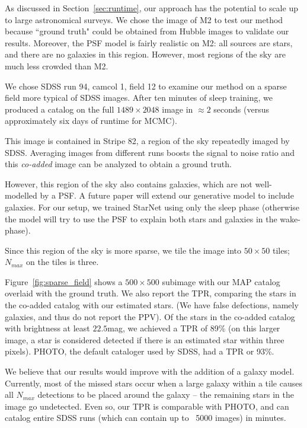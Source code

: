 As discussed in Section~\ref{sec:runtime}, our approach has the potential 
to scale up to large astronomical surveys. We chose the image of M2 to test our method because ``ground truth" could be obtained from Hubble images to validate our results. Moreover, 
the PSF model is fairly realistic on M2: all sources are 
stars, and there are no galaxies in this region. 
However, most regions of the sky are much less 
crowded than M2.


We chose SDSS run 94, camcol 1, field  12 to examine our method on a sparse field more typical of SDSS 
images. After ten minutes of sleep training, we produced a catalog on the full $1489\times 2048$ image in $\approx2$ seconds (versus approximately six days of runtime for MCMC). 

This image is contained in Stripe 82, a region of the sky repeatedly imaged by SDSS. Averaging images from different runs boosts the signal to noise ratio and this {\itshape co-added} image can be analyzed to obtain a ground truth. 

However, this region of the sky also contains galaxies, which are 
not well-modelled by a PSF. A future paper will extend our generative model to include galaxies. For our setup, we trained StarNet using only the sleep phase (otherwise the model will try to use the PSF to explain both stars and galaxies in the wake-phase). 

Since this region of the sky is more sparse, we tile the image into $50\times 50$ tiles; $N_{max}$ on the tiles is three. 

Figure~\ref{fig:sparse_field} shows a $500\times 500$ subimage with 
our MAP catalog overlaid with the ground truth. We also report the 
TPR, comparing the stars in the co-added catalog with our estimated stars. (We have false defections, namely galaxies, and thus 
do not report the PPV). Of the stars in the co-added catalog with brightness at least $22.5$mag, we achieved a TPR of 89\% (on this larger image, a star is considered detected if there is an estimated star within three pixels). PHOTO, the default cataloger used by SDSS, had a TPR or 93\%. 

We believe that our results would improve with the addition of a galaxy model. Currently, most of the missed stars occur when a large galaxy within a tile causes all $N_{max}$ detections to be placed around the galaxy -- the remaining stars in the image go undetected. Even so, our TPR is comparable with PHOTO, and can catalog entire SDSS runs (which can contain up to ~5000 images) in minutes. 


